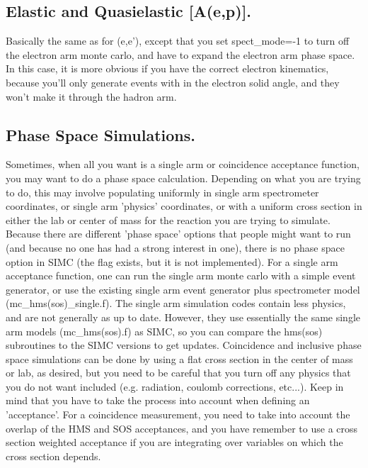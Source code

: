 \subsection{Elastic and Quasielastic [A(e,p)].}

	Basically the same as for (e,e'), except that you set spect\_mode=-1
to turn off the electron arm monte carlo, and have to expand the electron
arm phase space.  In this case, it is more obvious if you have the correct
electron kinematics, because you'll only generate events with in the electron
solid angle, and they won't make it through the hadron arm.

\subsection{Phase Space Simulations.}

	Sometimes, when all you want is a single arm or coincidence acceptance
function, you may want to do a phase space calculation.  Depending on what
you are trying to do, this may involve populating uniformly in single arm
spectrometer coordinates, or single arm 'physics' coordinates, or with
a uniform cross section in either the lab or center of mass for the reaction
you are trying to simulate.  Because there are different 'phase space' options
that people might want to run (and because no one has had a strong interest
in one), there is no phase space option in SIMC (the flag exists, but it is
not implemented).  For a single arm acceptance function, one can run the
single arm monte carlo with a simple event generator, or use the existing
single arm event generator plus spectrometer model (mc\_hms(sos)\_single.f).
The single arm simulation codes contain less physics, and are not generally
as up to date.  However, they use essentially the same single arm models
(mc\_hms(sos).f) as SIMC, so you can compare the hms(sos) subroutines to the
SIMC versions to get updates.  Coincidence and inclusive phase space
simulations can be done by using a flat cross section in the center of mass or
lab, as desired, but you need to be careful that you turn off any physics that
you do not want included (e.g. radiation, coulomb corrections, etc...).
Keep in mind that you have to take the process into account when defining
an 'acceptance'.  For a coincidence measurement, you need to take into account
the overlap of the HMS and SOS acceptances, and you have remember to use a
cross section weighted acceptance if you are integrating over variables on
which the cross section depends.

